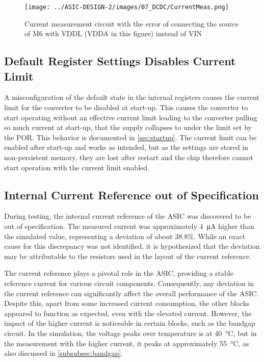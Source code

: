\begin{figure}[h]
    \centering
    \texttt{[image: ../ASIC-DESIGN-2/images/07\_DCDC/CurrentMeas.png]}
    \caption{Current measurement circuit with the error of connecting the source of M6 with VDDL (VDDA in this figure) instead of VIN}
    \label{fig:currentmeas}
\end{figure}


\subsection{Default Register Settings Disables Current Limit}
\label{sec:missingcurrentlimit}

A misconfiguration of the default state in the internal registers causes the current limit for the converter to be disabled at start-up. This causes the converter to start operating without an effective current limit leading to the converter pulling so much current at start-up, that the supply collapses to under the limit set by the \ac{POR}. This behavior is documented in \autoref{sec:startup}. The current limit can be enabled after start-up and works as intended, but as the settings are stored in non-persistent memory, they are lost after restart and the chip therefore cannot start operation with the current limit enabled. 


\subsection{Internal Current Reference out of Specification}
During testing, the internal current reference of the ASIC was discovered to be out of specification. The measured current was approximately \qty{4}{\micro\ampere} higher than the simulated value, representing a deviation of about 38.8\%. While an exact cause for this discrepancy was not identified, it is hypothesized that the deviation may be attributable to the resistors used in the layout of the current reference.

The current reference plays a pivotal role in the \ac{ASIC}, providing a stable reference current for various circuit components. Consequently, any deviation in the current reference can significantly affect the overall performance of the \ac{ASIC}. Despite this, apart from some increased current consumption, the other blocks appeared to function as expected, even with the elevated current. However, the impact of the higher current is noticeable in certain blocks, such as the bandgap circuit. In the simulation, the voltage peaks over temperature is at \qty{40}{\degreeCelsius}, but in the measurement with the higher current, it peaks at approximately \qty{55}{\degreeCelsius}, as also discussed in \autoref{subsubsec:bandgap}.


